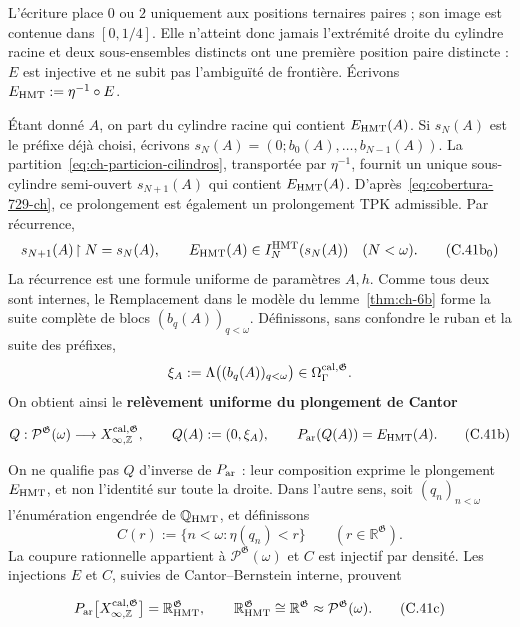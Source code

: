 L’écriture place \(0\) ou \(2\) uniquement aux positions ternaires
paires ; son image est contenue dans \([0,1/4]\). Elle n’atteint donc jamais
l’extrémité droite du cylindre racine et deux sous-ensembles distincts ont une
première position paire distincte : \(E\) est injective et ne subit pas l’ambiguïté de
frontière. Écrivons \(E_{\rm HMT}:=\eta^{-1}\circ E\).

Étant donné \(A\), on part du cylindre racine qui contient \(E_{\rm HMT}(A)\). Si \(s_N(A)\) est le préfixe déjà choisi, écrivons \(s_N(A)=(0;b_0(A),\ldots,b_{N-1}(A))\). La partition~\eqref{eq:ch-particion-cilindros}, transportée par \(\eta^{-1}\), fournit un unique sous-cylindre semi-ouvert \(s_{N+1}(A)\) qui contient \(E_{\rm HMT}(A)\). D'après~\eqref{eq:cobertura-729-ch}, ce prolongement est également un prolongement TPK admissible. Par récurrence,
\[
 s_{N+1}(A)\!\upharpoonright N=s_N(A),\qquad
 E_{\rm HMT}(A)\in I_N^{\rm HMT}(s_N(A))\quad(N<\omega).
\tag{C.41b$_0$}\label{eq:ch-prefijos-uniformes}
\]
La récurrence est une formule uniforme de paramètres \(A,h\). Comme tous deux sont
internes, le Remplacement dans le modèle du lemme~\ref{thm:ch-6b} forme la suite complète de
blocs \((b_q(A))_{q<\omega}\). Définissons, sans confondre le ruban et la
suite des préfixes,
\[
 \xi_A:=\Lambda\bigl((b_q(A))_{q<\omega}\bigr)
 \in\Omega_\Gamma^{\rm cal,\mathfrak G}.
\]
On obtient ainsi le \textbf{relèvement uniforme du plongement de Cantor}

\[
 Q:\mathcal P^{\mathfrak G}(\omega)
 \longrightarrow X_{\infty,\mathbb Z}^{\rm cal,\mathfrak G},
 \qquad
 Q(A):=(0,\xi_A),\qquad
 P_{\rm ar}(Q(A))=E_{\rm HMT}(A).
\tag{C.41b}\label{eq:ch-levantamiento-uniforme}
\]

On ne qualifie pas \(Q\) d'inverse de \(P_{\rm ar}\) : leur composition exprime le plongement \(E_{\rm HMT}\), et non l'identité sur toute la droite. Dans l'autre sens, soit \((q_n)_{n<\omega}\) l'énumération engendrée de \(\mathbb Q_{\rm HMT}\), et définissons
\[
 C(r):=\{n<\omega:\eta(q_n)<r\}
 \qquad(r\in\mathbb R^{\mathfrak G}).
\]
La coupure rationnelle appartient à \(\mathcal P^{\mathfrak G}(\omega)\) et \(C\) est injectif par densité. Les injections \(E\) et \(C\), suivies de Cantor--Bernstein interne, prouvent

\[
 P_{\rm ar}
 \bigl[X_{\infty,\mathbb Z}^{\rm cal,\mathfrak G}\bigr]
 =\mathbb R_{\rm HMT}^{\mathfrak G},
 \qquad
 \mathbb R_{\rm HMT}^{\mathfrak G}
 \cong\mathbb R^{\mathfrak G}
 \approx\mathcal P^{\mathfrak G}(\omega).
\tag{C.41c}\label{eq:ch-recta-potencia}
\]

